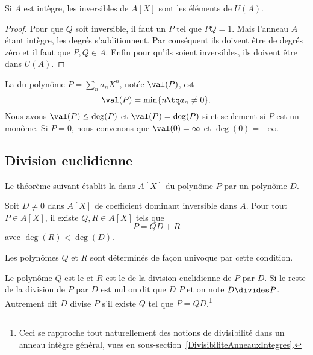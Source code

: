 \begin{corollary}
    Si \( A\) est intègre, les inversibles de \( A[X]\) sont les éléments de \( U(A)\).
\end{corollary}

\begin{proof}
    Pour que \( Q\) soit inversible, il faut un \( P\) tel que \( PQ=1\). Mais l'anneau \( A\) étant intègre, les degrés s'additionnent. Par conséquent ils doivent être de degrés zéro et il faut que \( P,Q\in A\). Enfin pour qu'ils soient inversibles, ils doivent être dans \( U(A)\).
\end{proof}

La  du polynôme \( P=\sum_n a_nX^n\), notée \( \val(P)\), est
\begin{equation}
    \val(P)=\min\{ n\tq a_n\neq 0 \}.
\end{equation}
Nous avons \( \val(P)\leq \deg(P)\) et \( \val(P)=\deg(P)\) si et seulement si \( P\) est un monôme. Si \( P=0\), nous convenons que \( \val(0)=\infty\) et \( \deg(0)=-\infty\).

\subsection{Division euclidienne}

Le théorème suivant établit la  dans \( A[X]\) du polynôme \( P\) par un polynôme \( D\).
\begin{theorem}     \label{ThodivEuclPsFexf}
    Soit \( D\neq 0\) dans \( A[X]\) de coefficient dominant inversible dans \( A\). Pour tout \( P\in A[X]\), il existe \( Q,R\in A[X]\) tels que
    \begin{equation}
        P=QD+R
    \end{equation}
    avec \( \deg(R)<\deg(D)\).

    Les polynômes \( Q\) et \( R\) sont déterminés de façon univoque par cette condition.
\end{theorem}

\begin{definition}\label{DefMPZooMmMymG}
    Le polynôme \( Q\) est le  et \( R\) est le  de la division euclidienne de \( P\) par \( D\). Si le reste de la division de \( P\) par $D$ est nul on dit que \( D\)  \( P\) et on note \( D\divides P\). Autrement dit \( D\) divise \( P\) s'il existe \( Q\) tel que \( P=QD\).\footnote{Ceci se rapproche tout naturellement des notions de divisibilité dans un anneau intègre général, vues en sous-section~\ref{DivisibiliteAnneauxIntegres}.}
\end{definition}

